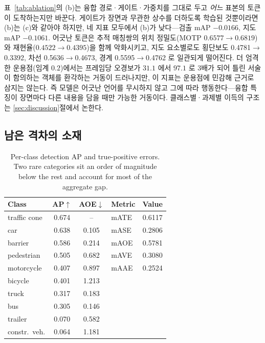 \documentclass[conference]{IEEEtran}
\newcommand{\measured}[1]{#1}
\begin{document}
표~\ref{tab:ablation}의 (b)는 융합 경로·게이트·가중치를 그대로 두고 \emph{어느} 표본의
토큰이 도착하는지만 바꾼다. 게이트가 장면과 무관한 상수를 더하도록 학습된 것뿐이라면 (b)는
(c)와 같아야 하지만, 네 지표 모두에서 (b)가 낮다---검출 mAP \measured{$-0.0166$}, 지도
mAP \measured{$-0.1061$}. 어긋난 토큰은 추적 매칭쌍의 위치 정밀도(MOTP
\measured{$0.6577$}$\to$\measured{$0.6819$})와
재현율(\measured{$0.4522$}$\to$\measured{$0.4395$})을 함께 악화시키고, 지도 요소별로도
횡단보도 \measured{0.4781}$\to$\measured{0.3392}, 차선 \measured{0.5636}$\to$\measured{0.4673},
경계 \measured{0.5595}$\to$\measured{0.4762} 로 일관되게 떨어진다.
더 엄격한 운용점(임계 $0.2$)에서는 프레임당 오경보가 \measured{$31.1$} 에서
\measured{$97.1$} 로 3배가 되어 틀린 서술이 함의하는 객체를 환각하는 거동이 드러나지만,
이 지표는 운용점에 민감해 근거로 삼지는 않는다. 즉 모델은 어긋난 언어를 무시하지 않고
그에 따라 행동한다---융합 특징이 장면마다 다른 내용을 담을 때만 가능한 거동이다. 클래스별·과제별
이득의 구조는 \ref{sec:discussion}절에서 논한다.

\subsection{남은 격차의 소재}

\begin{table}[t]
\caption{Per-class detection AP and true-positive errors. Two rare categories
sit an order of magnitude below the rest and account for most of the aggregate
gap.}
\label{tab:perclass}
\centering
\small
\begin{tabular}{lcc@{\hskip 8pt}lc}
\toprule
Class & AP$\uparrow$ & AOE$\downarrow$ & Metric & Value \\
\midrule
traffic cone & \measured{0.674} & --               & mATE & \measured{0.6117}\\
car          & \measured{0.638} & \measured{0.105} & mASE & \measured{0.2806}\\
barrier      & \measured{0.586} & \measured{0.214} & mAOE & \measured{0.5781}\\
pedestrian   & \measured{0.505} & \measured{0.682} & mAVE & \measured{0.3080}\\
motorcycle   & \measured{0.407} & \measured{0.897} & mAAE & \measured{0.2524}\\
bicycle      & \measured{0.401} & \measured{1.213} &      & \\
truck        & \measured{0.317} & \measured{0.183} &      & \\
bus          & \measured{0.305} & \measured{0.146} &      & \\
trailer      & \measured{0.070} & \measured{0.582} &      & \\
constr.\ veh.& \measured{0.064} & \measured{1.181} &      & \\
\bottomrule
\end{tabular}
\end{table}
\end{document}
